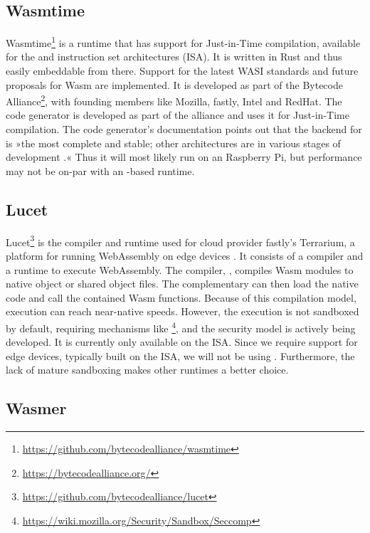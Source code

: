 \subsection{Wasmtime}

Wasmtime\footnote{\url{https://github.com/bytecodealliance/wasmtime}} is a runtime that has support for Just-in-Time compilation, available for the  and  instruction set architectures (ISA). It is written in Rust and thus easily embeddable from there. Support for the latest WASI standards and future proposals for Wasm are implemented.
It is developed as part of the Bytecode Alliance\footnote{\url{https://bytecodealliance.org/}}, with founding members like Mozilla, fastly, Intel and RedHat. The  code generator is developed as part of the alliance and  uses it for Just-in-Time compilation. The code generator's documentation points out that the backend for  is »the most complete and stable; other architectures are in various stages of development \cite{Alliance2021}.« 
Thus it will most likely run on an  Raspberry Pi, but performance may not be on-par with an -based runtime.

\subsection{Lucet}

Lucet\footnote{\url{https://github.com/bytecodealliance/lucet}} is the compiler and runtime used for cloud provider fastly's Terrarium, a platform for running WebAssembly on edge devices \cite{fastly2019}. It consists of a compiler and a runtime to execute WebAssembly. The compiler, , compiles Wasm modules to native object or shared object files. The complementary  can then load the native code and call the contained Wasm functions. Because of this compilation model, execution can reach near-native speeds. However, the execution is not sandboxed by default, requiring mechanisms like \footnote{\url{https://wiki.mozilla.org/Security/Sandbox/Seccomp}}, and the security model is actively being developed. It is currently only available on the  ISA. Since we require support for edge devices, typically built on the  ISA, we will not be using . Furthermore, the lack of mature sandboxing makes other runtimes a better choice.

\subsection{Wasmer}

